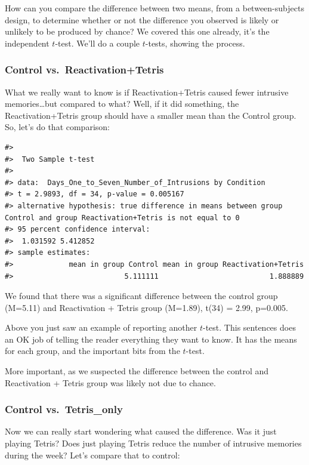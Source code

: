 \documentclass[
  letterpaper,
  DIV=11,
  numbers=noendperiod]{scrreprt}
\begin{document}
How can you compare the difference between two means, from a
between-subjects design, to determine whether or not the difference you
observed is likely or unlikely to be produced by chance? We covered this
one already, it's the independent \(t\)-test. We'll do a couple
\(t\)-tests, showing the process.

\subsubsection{Control
vs.~Reactivation+Tetris}\label{control-vs.-reactivationtetris}

What we really want to know is if Reactivation+Tetris caused fewer
intrusive memories\ldots but compared to what? Well, if it did
something, the Reactivation+Tetris group should have a smaller mean than
the Control group. So, let's do that comparison:

\begin{verbatim}
#> 
#>  Two Sample t-test
#> 
#> data:  Days_One_to_Seven_Number_of_Intrusions by Condition
#> t = 2.9893, df = 34, p-value = 0.005167
#> alternative hypothesis: true difference in means between group Control and group Reactivation+Tetris is not equal to 0
#> 95 percent confidence interval:
#>  1.031592 5.412852
#> sample estimates:
#>             mean in group Control mean in group Reactivation+Tetris 
#>                          5.111111                          1.888889
\end{verbatim}

We found that there was a significant difference between the control
group (M=5.11) and Reactivation + Tetris group (M=1.89), t(34) = 2.99,
p=0.005.

Above you just saw an example of reporting another \(t\)-test. This
sentences does an OK job of telling the reader everything they want to
know. It has the means for each group, and the important bits from the
\(t\)-test.

More important, as we suspected the difference between the control and
Reactivation + Tetris group was likely not due to chance.

\subsubsection{Control vs.~Tetris\_only}\label{control-vs.-tetris_only}

Now we can really start wondering what caused the difference. Was it
just playing Tetris? Does just playing Tetris reduce the number of
intrusive memories during the week? Let's compare that to control:
\end{document}
